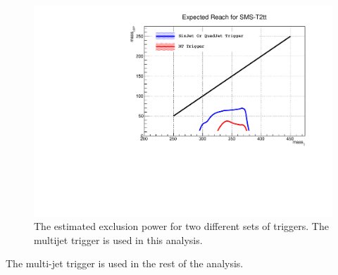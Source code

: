 \begin{figure}[htbp] 
\centering
\includegraphics[angle=0,scale=0.5]{figs/SMST2tt_20121114.pdf}
\caption{The estimated exclusion power for two different sets of triggers. The multijet trigger is used in this analysis.}
\label{fig:trgs_exclusion_powers}
\end{figure}
The multi-jet trigger is used in the rest of the analysis.